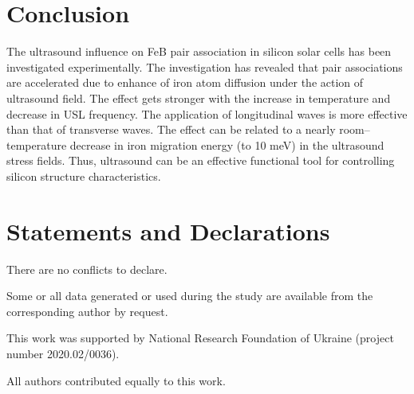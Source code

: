 \documentclass[sn-mathphys]{sn-jnl}%
\theoremstyle{thmstyleone}%
\theoremstyle{thmstyletwo}%
\theoremstyle{thmstylethree}%
\begin{document}
\section{Conclusion}

The ultrasound influence on
FeB pair association in silicon solar cells has been investigated experimentally.
The investigation has revealed that pair associations are accelerated due to enhance of iron
atom diffusion under the action of ultrasound field.
The effect gets stronger with the increase in temperature and decrease in USL frequency.
The application of longitudinal waves is more effective than that of transverse waves.
The effect can be related to a nearly room--temperature decrease in iron migration energy (to 10 meV) in the ultrasound stress ﬁelds.
Thus, ultrasound can be an effective functional tool for controlling silicon structure characteristics.


\backmatter


%

\section*{Statements and Declarations}

There are no conflicts to declare.

Some or all data generated or used during the study are available from the corresponding author by request.

This work was supported by National Research Foundation  of Ukraine (project number 2020.02/0036).

All authors contributed equally to this work.

%
%




\end{document}
